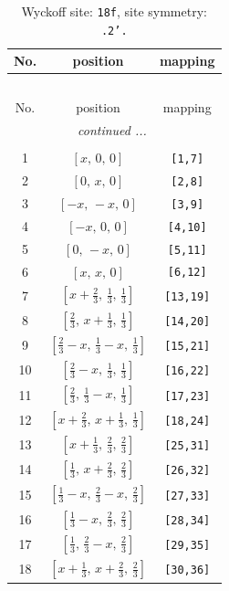 \documentclass[fleqn,8pt]{jsarticle}
\begin{document}
\begin{longtable}{ccc}
\caption{Wyckoff site: {\tt 18f}, site symmetry: {\tt .2'.}}
 \\
 \hline \hline
No. & position & mapping \\ \hline \endfirsthead

\multicolumn{2}{l}{\tablename\ \thetable{}} \\
 \hline \hline
No. & position & mapping \\ \hline \endhead

 \hline \hline
\multicolumn{2}{r}{\footnotesize\it continued ...} \\ \endfoot

 \hline \hline
\multicolumn{2}{r}{} \\ \endlastfoot

1 & $\left[ x,\, 0,\, 0 \right]$ & {\tt [1,7]} \\ \hline
2 & $\left[ 0,\, x,\, 0 \right]$ & {\tt [2,8]} \\ \hline
3 & $\left[ - x,\, - x,\, 0 \right]$ & {\tt [3,9]} \\ \hline
4 & $\left[ - x,\, 0,\, 0 \right]$ & {\tt [4,10]} \\ \hline
5 & $\left[ 0,\, - x,\, 0 \right]$ & {\tt [5,11]} \\ \hline
6 & $\left[ x,\, x,\, 0 \right]$ & {\tt [6,12]} \\ \hline
7 & $\left[ x + \frac{2}{3},\, \frac{1}{3},\, \frac{1}{3} \right]$ & {\tt [13,19]} \\ \hline
8 & $\left[ \frac{2}{3},\, x + \frac{1}{3},\, \frac{1}{3} \right]$ & {\tt [14,20]} \\ \hline
9 & $\left[ \frac{2}{3} - x,\, \frac{1}{3} - x,\, \frac{1}{3} \right]$ & {\tt [15,21]} \\ \hline
10 & $\left[ \frac{2}{3} - x,\, \frac{1}{3},\, \frac{1}{3} \right]$ & {\tt [16,22]} \\ \hline
11 & $\left[ \frac{2}{3},\, \frac{1}{3} - x,\, \frac{1}{3} \right]$ & {\tt [17,23]} \\ \hline
12 & $\left[ x + \frac{2}{3},\, x + \frac{1}{3},\, \frac{1}{3} \right]$ & {\tt [18,24]} \\ \hline
13 & $\left[ x + \frac{1}{3},\, \frac{2}{3},\, \frac{2}{3} \right]$ & {\tt [25,31]} \\ \hline
14 & $\left[ \frac{1}{3},\, x + \frac{2}{3},\, \frac{2}{3} \right]$ & {\tt [26,32]} \\ \hline
15 & $\left[ \frac{1}{3} - x,\, \frac{2}{3} - x,\, \frac{2}{3} \right]$ & {\tt [27,33]} \\ \hline
16 & $\left[ \frac{1}{3} - x,\, \frac{2}{3},\, \frac{2}{3} \right]$ & {\tt [28,34]} \\ \hline
17 & $\left[ \frac{1}{3},\, \frac{2}{3} - x,\, \frac{2}{3} \right]$ & {\tt [29,35]} \\ \hline
18 & $\left[ x + \frac{1}{3},\, x + \frac{2}{3},\, \frac{2}{3} \right]$ & {\tt [30,36]} \\
\end{longtable}
\end{document}
